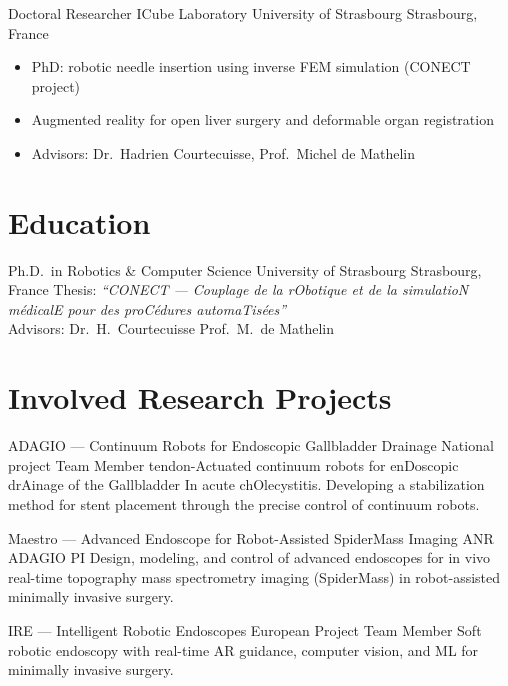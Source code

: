 \documentclass[11pt,a4paper,sans]{moderncv}
\begin{document}
%
  {Doctoral Researcher}%
  {ICube Laboratory \textperiodcentered{} University of Strasbourg}%
  {Strasbourg, France}{}%
  {\begin{itemize}[noitemsep,topsep=2pt]
    \item PhD: robotic needle insertion using inverse FEM simulation (CONECT project)
    \item Augmented reality for open liver surgery and deformable organ registration
    \item Advisors: Dr.\ Hadrien Courtecuisse, Prof.\ Michel de Mathelin
  \end{itemize}}

\section{Education}

%
  {Ph.D.\ in Robotics \& Computer Science}%
  {University of Strasbourg}%
  {Strasbourg, France}{}%
  {Thesis: \textit{``CONECT --- Couplage de la rObotique et de la simulatioN médicalE pour des proCédures automaTisées''}\\
   Advisors: Dr.\ H.\ Courtecuisse \textperiodcentered{} Prof.\ M.\ de Mathelin}

\section{Involved Research Projects}

%
  {ADAGIO --- Continuum Robots for Endoscopic Gallbladder Drainage}%
  {National project \textperiodcentered{} Team Member}{}{}%
  {tendon-Actuated continuum robots for enDoscopic drAinage of the Gallbladder In acute chOlecystitis. Developing a stabilization method for stent placement through the precise control of continuum robots.}

%
  {Maestro --- Advanced Endoscope for Robot-Assisted SpiderMass Imaging}%
  {ANR ADAGIO \textperiodcentered{} PI}{}{}%
  {Design, modeling, and control of advanced endoscopes for in vivo real-time topography mass spectrometry imaging (SpiderMass) in robot-assisted minimally invasive surgery.}

%
  {IRE --- Intelligent Robotic Endoscopes}%
  {European Project \textperiodcentered{} Team Member}{}{}%
  {Soft robotic endoscopy with real-time AR guidance, computer vision, and ML for minimally invasive surgery.}
\end{document}
